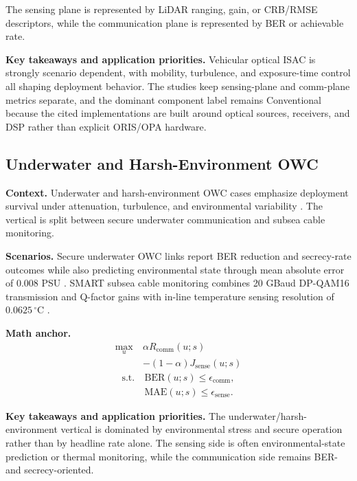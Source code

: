 \documentclass[lettersize,journal]{IEEEtran}
\begin{document}
The sensing plane is represented by LiDAR ranging, gain, or CRB/RMSE descriptors, while the communication plane is represented by BER or achievable rate.

\textbf{Key takeaways and application priorities.} Vehicular optical ISAC is strongly scenario dependent, with mobility, turbulence, and exposure-time control all shaping deployment behavior. The studies keep sensing-plane and comm-plane metrics separate, and the dominant component label remains Conventional because the cited implementations are built around optical sources, receivers, and DSP rather than explicit ORIS/OPA hardware.

\subsection{Underwater and Harsh-Environment OWC}

\textbf{Context.} Underwater and harsh-environment OWC cases emphasize deployment survival under attenuation, turbulence, and environmental variability \cite{O_ISAC_127,O_ISAC_220}. The vertical is split between secure underwater communication and subsea cable monitoring.

\textbf{Scenarios.} Secure underwater OWC links report BER reduction and secrecy-rate outcomes while also predicting environmental state through mean absolute error of 0.008 PSU \cite{O_ISAC_127}. SMART subsea cable monitoring combines 20 GBaud DP-QAM16 transmission and Q-factor gains with in-line temperature sensing resolution of $0.0625\,^{\circ}\mathrm{C}$ \cite{O_ISAC_220}.

\textbf{Math anchor.}
\begin{equation}
\begin{split}
\max_u\ &\alpha R_{\mathrm{comm}}(u;s)\\
&-(1-\alpha)J_{\mathrm{sense}}(u;s)
\end{split}
\end{equation}
\begin{equation}
\begin{split}
\text{s.t.}\ &\mathrm{BER}(u;s)\le \epsilon_{\mathrm{comm}},\\
&\mathrm{MAE}(u;s)\le \epsilon_{\mathrm{sense}}.
\end{split}
\end{equation}

\textbf{Key takeaways and application priorities.} The underwater/harsh-environment vertical is dominated by environmental stress and secure operation rather than by headline rate alone. The sensing side is often environmental-state prediction or thermal monitoring, while the communication side remains BER- and secrecy-oriented.
\end{document}
